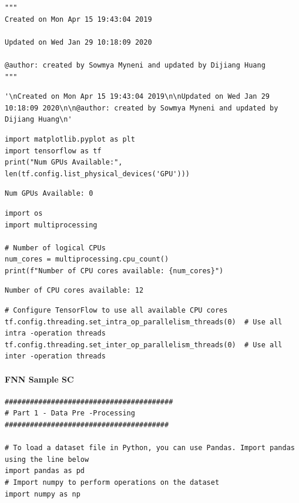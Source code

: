 \begin{verbatim}
"""
Created on Mon Apr 15 19:43:04 2019

Updated on Wed Jan 29 10:18:09 2020

@author: created by Sowmya Myneni and updated by Dijiang Huang
"""
\end{verbatim}

\begin{verbatim}
'\nCreated on Mon Apr 15 19:43:04 2019\n\nUpdated on Wed Jan 29 10:18:09 2020\n\n@author: created by Sowmya Myneni and updated by Dijiang Huang\n'
\end{verbatim}

\begin{verbatim}
import matplotlib.pyplot as plt
import tensorflow as tf
print("Num GPUs Available:", len(tf.config.list_physical_devices('GPU')))
\end{verbatim}

\begin{verbatim}
Num GPUs Available: 0
\end{verbatim}

\begin{verbatim}
import os
import multiprocessing

# Number of logical CPUs
num_cores = multiprocessing.cpu_count()
print(f"Number of CPU cores available: {num_cores}")
\end{verbatim}

\begin{verbatim}
Number of CPU cores available: 12
\end{verbatim}

\begin{verbatim}
# Configure TensorFlow to use all available CPU cores
tf.config.threading.set_intra_op_parallelism_threads(0)  # Use all intra -operation threads
tf.config.threading.set_inter_op_parallelism_threads(0)  # Use all inter -operation threads
\end{verbatim}

\paragraph{FNN Sample SC}

\begin{verbatim}
########################################
# Part 1 - Data Pre -Processing
#######################################

# To load a dataset file in Python, you can use Pandas. Import pandas using the line below
import pandas as pd
# Import numpy to perform operations on the dataset
import numpy as np
\end{verbatim}

